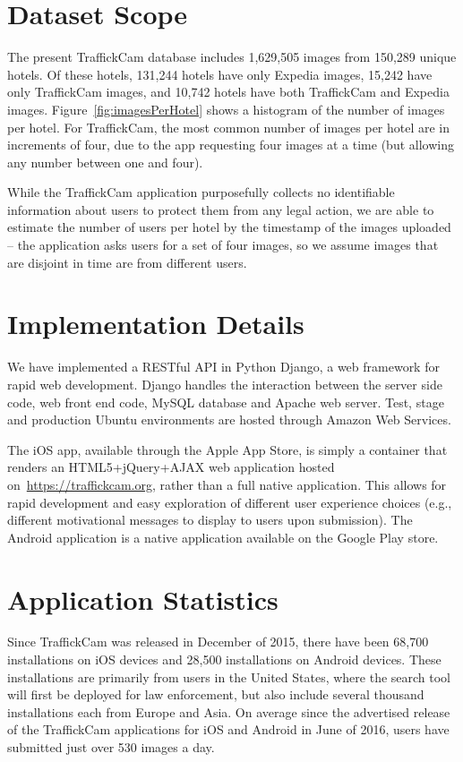 \section{Dataset Scope}
The present TraffickCam database includes 1,629,505 images from 150,289 unique hotels. Of these hotels, 131,244 hotels have only Expedia images, 15,242 have only TraffickCam images, and 10,742 hotels have both TraffickCam and Expedia images. Figure~\ref{fig:imagesPerHotel} shows a histogram of the number of images per hotel. For TraffickCam, the most common number of images per hotel are in increments of four, due to the app requesting four images at a time (but allowing any number between one and four).

While the TraffickCam application purposefully collects no identifiable information about users to protect them from any legal action, we are able to estimate the number of users per hotel by the timestamp of the images uploaded -- the application asks users for a set of four images, so we assume images that are disjoint in time are from different users.

\section{Implementation Details}
We have implemented a RESTful API in Python Django, a web framework for rapid web development. Django handles the interaction between the server side code, web front end code, MySQL database and Apache web server. Test, stage and production Ubuntu environments are hosted through Amazon Web Services.

The iOS app, available through the Apple App Store, is simply a container that renders an HTML5+jQuery+AJAX web application hosted on~\url{https://traffickcam.org}, rather than a full native application. This allows for rapid development and easy exploration of different user experience choices (e.g., different motivational messages to display to users upon submission). The Android application is a native application available on the Google Play store.

\section{Application Statistics}
Since TraffickCam was released in December of 2015, there have been 68,700 installations on iOS devices and 28,500 installations on Android devices. These installations are primarily from users in the United States, where the search tool will first be deployed for law enforcement, but also include several thousand installations each from Europe and Asia. On average since the advertised release of the TraffickCam applications for iOS and Android in June of 2016, users have submitted just over 530 images a day.
